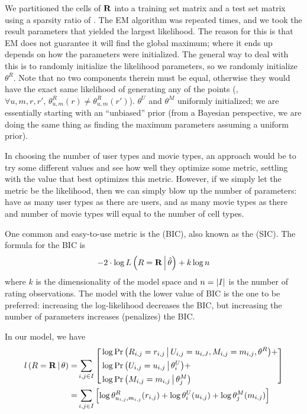 \documentclass{article}
\begin{document}
We partitioned the cells of ${\bf R}$ into a training set matrix and a
test set matrix using a sparsity ratio of . The
EM algorithm was repeated  times, and we took the
result parameters that yielded the largest likelihood. The reason for
this is that EM does not guarantee it will find the global maximum;
where it ends up depends on how the parameters were initialized.  The
general way to deal with this is to randomly initialize the likelihood
parameters, so we randomly initialize $\theta^R$. Note that no two
components therein must be equal, otherwise they would have the exact
same likelihood of generating any of the points (\ie, $\forall
u,m,r,r', \, \theta^R_{u,m}(r) \ne \theta^R_{u,m}(r')$). $\theta^U$
and $\theta^M$  uniformly initialized; we are essentially
starting with an ``unbiased'' prior (from a Bayesian perspective, we
are doing the same thing as finding the maximum 
parameters assuming a uniform prior).

In choosing the number of user types and movie types, an approach
would be to try some different values and see how well they optimize
some metric, settling with the value that best optimizes this
metric.  However, if we
simply let the metric be the likelihood, then we can simply blow up
the number of parameters: have as many user types as there are users,
and as many movie types as there and number of movie types will equal
to the number of cell types.

One common and easy-to-use metric is the  (BIC), also known as the  (SIC). The formula for the BIC is
\begin{align}
-2 \cdot \log {\ensuremath{ L \left( R = {\bf R} \,\middle|\, \hat{\theta} \right) }} + k \log n
\end{align}
where $k$ is the dimensionality of the model space and $n = {\lvert I \rvert}$
is the number of rating observations. The model with the lower value
of BIC is the one to be preferred: increasing the log-likelihood
decreases the BIC, but increasing the number of parameters
increases (penalizes) the BIC.

In our model, we have 
\begin{align}
{\ensuremath{ l \left( R = {\bf R} \,\middle|\, \theta \right) }}
  =& \sum_{i,j \in I} \left[
    \begin{aligned}
      & \log {{\Pr \left(  R_{i,j} = r_{i,j} \,\middle|\, U_{i,j} = u_{i,J}, M_{i,j} = m_{i,j},
        \theta^R  \right)}} + \\
      & \log {{\Pr \left(  U_{i,j} = u_{i,j} \,\middle|\, \theta^U_i  \right)}} + \\
      & \log {{\Pr \left(  M_{i,j} = m_{i,j} \,\middle|\, \theta^M_j  \right)}}
    \end{aligned}
  \right] \\
  =& \sum_{i,j \in I} \left[
    \log \theta^R_{u_{i,j},m_{i,j}}(r_{i,j}) +
    \log \theta^U_i(u_{i,j}) +
    \log \theta^M_j(m_{i,j})
  \right] \\
\end{align}
\end{document}
